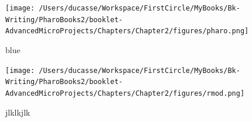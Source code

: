 \documentclass[10pt,twoside,english]{_support/latex/sbabook/sbabook}
\begin{document}
\begin{figure}[htpb]
\begin{center}
\texttt{[image: /Users/ducasse/Workspace/FirstCircle/MyBooks/Bk-Writing/PharoBooks2/booklet-AdvancedMicroProjects/Chapters/Chapter2/figures/pharo.png]}
\caption{blue}
\end{center}
\end{figure}
\begin{figure}[htpb]
\begin{center}
\texttt{[image: /Users/ducasse/Workspace/FirstCircle/MyBooks/Bk-Writing/PharoBooks2/booklet-AdvancedMicroProjects/Chapters/Chapter2/figures/rmod.png]}
\caption{jlklkjlk}
\end{center}
\end{figure}







\backmatter

\end{document}
